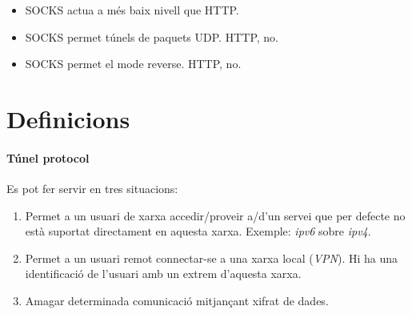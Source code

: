 \documentclass[a4paper]{article}
\begin{document}
\begin{itemize}
	\item SOCKS actua a m\'es baix nivell que HTTP.
	\item SOCKS permet túnels de paquets UDP. HTTP, no.
	\item SOCKS permet el mode reverse. HTTP, no.
\end{itemize}

\appendix

\section{Definicions}
\paragraph{Túnel protocol} Es pot fer servir en tres situacions:
\begin{enumerate}
	\item Permet a un usuari de xarxa accedir/proveir a/d'un servei que per defecte no està suportat directament en aquesta xarxa. Exemple: \textit{ipv6} sobre \textit{ipv4}.
	\item Permet a un usuari remot connectar-se a una xarxa local (\textit{VPN}). Hi ha una identificació de l'usuari amb un extrem d'aquesta xarxa.
	\item Amagar determinada comunicació mitjançant xifrat de dades.
\end{enumerate}

\begin{thebibliography}{99}
	\bibitem{} 
\end{thebibliography}
\end{document}
